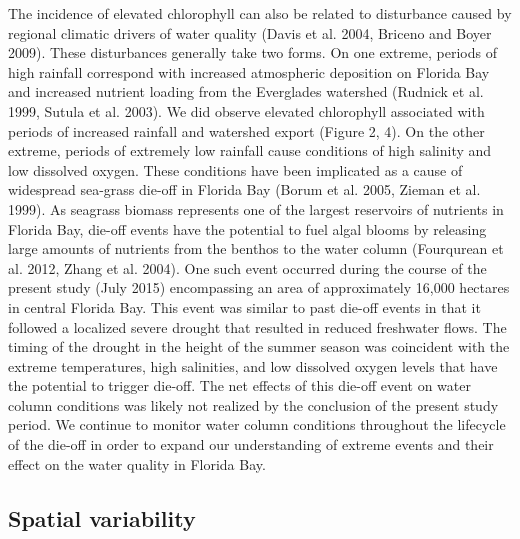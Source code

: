 The incidence of elevated chlorophyll can also be related to disturbance caused by regional climatic drivers of water quality (Davis et al. 2004, Briceno and Boyer 2009). These disturbances generally take two forms. On one extreme, periods of high rainfall correspond with increased atmospheric deposition on Florida Bay and increased nutrient loading from the Everglades watershed (Rudnick et al. 1999, Sutula et al. 2003). We did observe elevated chlorophyll associated with periods of increased rainfall and watershed export (Figure 2, 4).  On the other extreme, periods of extremely low rainfall cause conditions of high salinity and low dissolved oxygen. These conditions have been implicated as a cause of widespread sea-grass die-off in Florida Bay (Borum et al. 2005, Zieman et al. 1999). As seagrass biomass represents one of the largest reservoirs of nutrients in Florida Bay, die-off events have the potential to fuel algal blooms by releasing large amounts of nutrients from the benthos to the water column (Fourqurean et al. 2012, Zhang et al. 2004). One such event occurred during the course of the present study (July 2015) encompassing an area of approximately 16,000 hectares in central Florida Bay. This event was similar to past die-off events in that it followed a localized severe drought that resulted in reduced freshwater flows. The timing of the drought in the height of the summer season was coincident with the extreme temperatures, high salinities, and low dissolved oxygen levels that have the potential to trigger die-off. The net effects of this die-off event on water column conditions was likely not realized by the conclusion of the present study period. We continue to monitor water column conditions throughout the lifecycle of the die-off in order to expand our understanding of extreme events and their effect on the water quality in Florida Bay.

\subsection{Spatial variability}
\label{spatialvariability}

